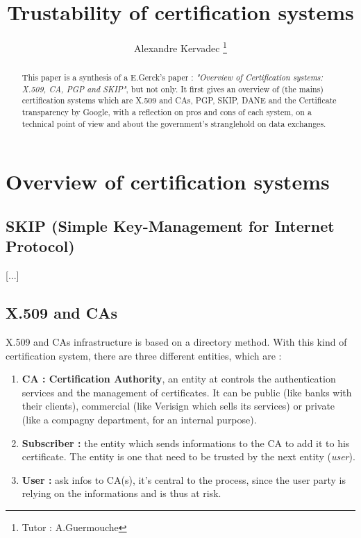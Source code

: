 \documentclass[journal, a4paper]{IEEEtran}
\begin{document}
	\title{Trustability of certification systems}
	\author{Alexandre Kervadec
	\thanks{Tutor : A.Guermouche}}
	\maketitle

\begin{abstract}
This paper is a synthesis of a E.Gerck's paper : \textit{"Overview of Certification systems: X.509, CA, PGP and SKIP"}\cite{gerck1998overview}, but not only. It first gives an overview of (the mains) certification systems which are X.509 and CAs, PGP, SKIP, DANE and the Certificate transparency by Google, with a reflection on pros and cons of each system, on a technical point of view and about the government's stranglehold on data exchanges.
\end{abstract}

\section{Overview of certification systems}

\subsection{SKIP (Simple Key-Management for Internet Protocol)}

[...]

\subsection{X.509 and CAs}

X.509 and CAs\cite{rfc3647} infrastructure is based on a directory method.
With this kind of certification system, there are three different entities, which are :

\begin{enumerate}
	\item \textbf{CA : Certification Authority}, an entity at controls the authentication services and the management of certificates. It can be public (like banks with their clients), commercial (like Verisign which sells its services) or private (like a compagny department, for an internal purpose).
	\item \textbf{Subscriber :} the entity which sends informations to the CA to add it to his certificate. The entity is one that need to be trusted by the next entity (\textit{user}).
	\item \textbf{User :} ask infos to CA(s), it's central to the process, since the user party is relying on the informations and is thus at risk.
\end{enumerate}
\end{document}
